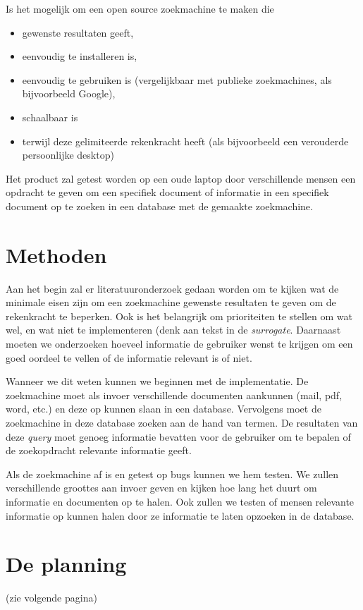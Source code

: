 \documentclass{uva-inf-article}
\begin{document}
Is het mogelijk om een open source zoekmachine te maken die
\begin{itemize}
    \item gewenste resultaten geeft,
    \item eenvoudig te installeren is,
    \item eenvoudig te gebruiken is (vergelijkbaar met publieke zoekmachines, als bijvoorbeeld Google),
    \item schaalbaar is
    \item terwijl deze gelimiteerde rekenkracht heeft (als bijvoorbeeld een verouderde persoonlijke desktop)
\end{itemize}

Het product zal getest worden op een oude laptop door verschillende mensen een opdracht te geven om een specifiek document of informatie in een specifiek document op te zoeken in een database met de gemaakte zoekmachine. 

\section{Methoden}
Aan het begin zal er literatuuronderzoek gedaan worden om te kijken wat de minimale eisen zijn om een zoekmachine gewenste resultaten te geven om de rekenkracht te beperken. Ook is het belangrijk om prioriteiten te stellen om wat wel, en wat niet te implementeren (denk aan tekst  in de \textit{surrogate}. Daarnaast moeten we onderzoeken hoeveel informatie de gebruiker wenst te krijgen om een goed oordeel te vellen of de informatie relevant is of niet. 

Wanneer we dit weten kunnen we beginnen met de implementatie. De zoekmachine moet als invoer verschillende documenten aankunnen (mail, pdf, word, etc.) en deze op kunnen slaan in een database. Vervolgens moet de zoekmachine in deze database zoeken aan de hand van termen. De resultaten van deze \textit{query} moet genoeg informatie bevatten voor de gebruiker om te bepalen of de zoekopdracht relevante informatie geeft. 

Als de zoekmachine af is en getest op bugs kunnen we hem testen. We zullen verschillende groottes aan invoer geven en kijken hoe lang het duurt om informatie en documenten op te halen. Ook zullen we testen of mensen relevante informatie op kunnen halen door ze informatie te laten opzoeken in de database. 

\section{De planning} 
(zie volgende pagina)





\printbibliography

\end{document}
